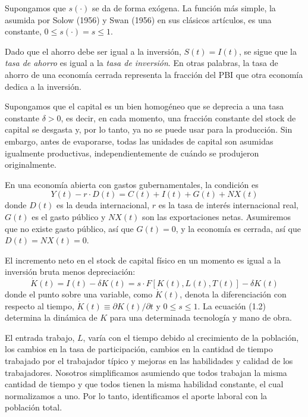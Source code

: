 Supongamos que $s\left(\cdot\right)$ se da de forma exógena. La función más simple, la asumida por Solow (1956) y Swan (1956) en sus clásicos artículos, es una constante, $0\leq s\left(\cdot\right)=s\leq1$.

Dado que el ahorro debe ser igual a la inversión, $S\left(t\right)=I\left(t\right)$, se sigue que la \emph{tasa de ahorro} es igual a la \emph{tasa de inversión}. En otras palabras, la tasa de ahorro de una economía cerrada representa la fracción del PBI que otra economía dedica a la inversión.

Supongamos que el capital es un bien homogéneo que se deprecia a una tasa constante $\delta>0$, es decir, en cada momento, una fracción constante del stock de capital se desgasta y, por lo tanto, ya no se puede usar para la producción. Sin embargo, antes de evaporarse, todas las unidades de capital son asumidas igualmente productivas, independientemente de cuándo se produjeron originalmente.

\begin{remark}
En una economía abierta con gastos gubernamentales, la condición es \[ Y\left(t\right)-r\cdot D\left(t\right)=C\left(t\right)+I\left(t\right)+G\left(t\right)+N X\left(t\right) \] donde $D\left(t\right)$ es la deuda internacional, $r$ es la tasa de interés internacional real, $G\left(t\right)$ es el gasto público y $N X\left(t\right)$ son las exportaciones netas. Asumiremos que no existe gasto público, así que $G\left(t\right)=0$, y la economía es cerrada, así que $D\left(t\right)=N X\left(t\right)=0$.
\end{remark}

El incremento neto en el stock de capital físico en un momento es igual a la inversión bruta menos depreciación:
\begin{equation}
\dot{K}\left(t\right)=I\left(t\right)-\delta K\left(t\right)=s\cdot F\left[K\left(t\right),L\left(t\right),T\left(t\right)\right]-\delta K\left(t\right)
\end{equation}
donde el punto sobre una variable, como $\dot{K}\left(t\right)$, denota la diferenciación con respecto al tiempo, $\dot{K}\left(t\right)\equiv\partial K\left(t\right)/\partial t$ y $0\leq s\leq1$. La ecuación (1.2) determina la dinámica de $K$ para una determinada tecnología y mano de obra.

El entrada trabajo, $L$, varía con el tiempo debido al crecimiento de la población, los cambios en la tasa de participación, cambios en la cantidad de tiempo trabajado por el trabajador típico y mejoras en las habilidades y calidad de los trabajadores. Nosotros simplificamos asumiendo que todos trabajan la misma cantidad de tiempo y que todos tienen la misma habilidad constante, el cual normalizamos a uno. Por lo tanto, identificamos el aporte laboral con la población total.

